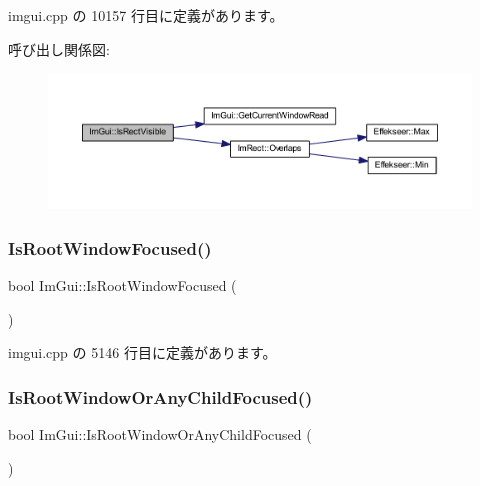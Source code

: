  imgui.\+cpp の 10157 行目に定義があります。

呼び出し関係図\+:\nopagebreak
\begin{figure}[H]
\begin{center}
\leavevmode
\includegraphics[width=350pt]{namespace_im_gui_a5aca7e6939e07caaca489aa8c776fd81_cgraph}
\end{center}
\end{figure}
\mbox{\label{namespace_im_gui_abf8f15c7648d453142b0dc72bc5ed8ba}} 
\subsubsection{\texorpdfstring{Is\+Root\+Window\+Focused()}{IsRootWindowFocused()}}
{\footnotesize\ttfamily bool Im\+Gui\+::\+Is\+Root\+Window\+Focused (\begin{DoxyParamCaption}{ }\end{DoxyParamCaption})}



 imgui.\+cpp の 5146 行目に定義があります。

\mbox{\label{namespace_im_gui_ad7175b87a80da527fb5ba5bc75993091}} 
\subsubsection{\texorpdfstring{Is\+Root\+Window\+Or\+Any\+Child\+Focused()}{IsRootWindowOrAnyChildFocused()}}
{\footnotesize\ttfamily bool Im\+Gui\+::\+Is\+Root\+Window\+Or\+Any\+Child\+Focused (\begin{DoxyParamCaption}{ }\end{DoxyParamCaption})}



